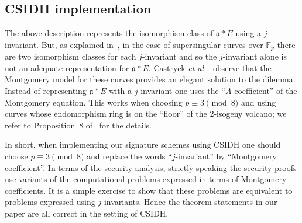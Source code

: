 \documentclass{llncs}
\newcommand{\F}{\mathbb{F}}
\renewcommand{\a}{\mathfrak{a}}
\newcommand{\longversion}[1]{}
\begin{document}
\longversion{
We discuss some possible optimisations in Section~\ref{sec:variants}, including the idea to use discrete Gaussians instead of uniform distributions for the vectors.
}

%
%
%



\subsection{CSIDH implementation} \label{sec:CSIDH-implementation}

The above description represents the isomorphism class of $\a * E$ using a $j$-invariant.
But, as explained in~\cite{DG16,CLMPR18}, in the case of supersingular curves over $\F_p$ there are two isomorphism classes for each $j$-invariant and so the $j$-invariant alone is not an adequate representation for $\a * E$.
Castryck \emph{et al.}~\cite{CLMPR18} observe that the Montgomery model for these curves provides an elegant solution to the dilemma.
Instead of representing $\a * E$ with a $j$-invariant one uses the ``$A$ coefficient'' of the Montgomery equation.
This works when choosing $p \equiv 3 \pmod{8}$ and using curves whose endomorphism ring is on the ``floor'' of the 2-isogeny volcano; we refer to Proposition~8 of~\cite{CLMPR18} for the details. 

In short, when implementing our signature schemes using CSIDH one should choose $p \equiv 3 \pmod{8}$ and replace the words ``$j$-invariant'' by ``Montgomery coefficient''.
In terms of the security analysis, strictly speaking the security proofs use variants of the computational problems expressed in terms of Montgomery coefficients.
It is a simple exercise to show that these problems are equivalent to problems expressed using $j$-invariants.
Hence the theorem statements in our paper are all correct in the setting of CSIDH.
\end{document}
